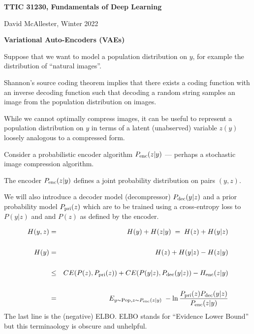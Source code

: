 




{\Huge

  \centerline{\bf TTIC 31230, Fundamentals of Deep Learning}
  \bigskip
  \centerline{David McAllester, Winter 2022}
  \vfill
  \vfill
  \centerline{\bf Variational Auto-Encoders (VAEs)}
  \vfill
  \vfill



Suppose that we want to model a population distribution on $y$, for example the distribution of ``natural images''.

\vfill
Shannon's source coding theorem implies that there exists a coding function with an inverse decoding function such that
decoding a random string samples an image from the population distribution on images.

\vfill
While we cannot optimally compress images, it can be useful to represent a population distribution on $y$ in terms of a latent (unabserved) variable $z(y)$ loosely analogous to a compressed form.


Consider a probabilistic encoder algorithm $P_{\mathrm{enc}}(z|y)$ --- perhaps a stochastic image compression algorithm.

\vfill
The encoder $P_{\mathrm{enc}}(z|y)$ defines a joint probability distribution on pairs $(y,z)$.

\vfill
We will also introduce a decoder model (decompressor) $P_{\mathrm{dec}}(y|z)$ and a prior probability model $P_{\mathrm{pri}}(z)$ which are to be trained
using a cross-entropy loss to $P(y|z)$ and and $P(z)$ as defined by the encoder.


{\huge
\begin{eqnarray*}
H(y,z) & = & H(y) + H(z|y) \; = \; H(z) + H(y|z) \\
\\
H(y) & = & H(z) + H(y|z) - H(z|y) \\
\\
& \leq & CE(P(z),P_{\mathrm{pri}}(z)) + CE(P(y|z),P_{\mathrm{dec}}(y|z)) -H_{\mathrm{enc}}(z|y) \\
\\
& = & E_{y\sim \mathrm{Pop}, z \sim P_{\mathrm{enc}}(z|y)}\;-\ln \frac{P_{\mathrm{pri}}(z)P_{\mathrm{dec}}(y|z)}{P_{\mathrm{enc}}(z|y)}
\end{eqnarray*}
}
\vfill
The last line is the (negative) ELBO.  ELBO stands for ``Evidence Lower Bound'' but this terminaology is obscure and unhelpful.


}
